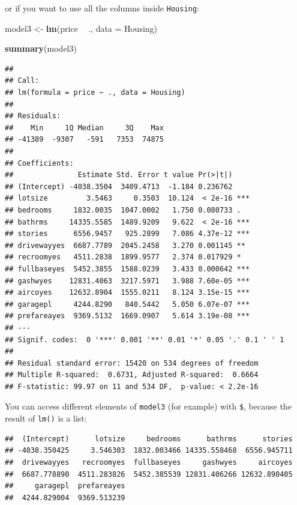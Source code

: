 \documentclass[]{gitbook}
\newenvironment{Shaded}{\begin{snugshade}}{\end{snugshade}}
\newcommand{\DataTypeTok}[1]{\textcolor[rgb]{0.13,0.29,0.53}{#1}}
\newcommand{\KeywordTok}[1]{\textcolor[rgb]{0.13,0.29,0.53}{\textbf{#1}}}
\newcommand{\NormalTok}[1]{#1}
\newcommand{\OperatorTok}[1]{\textcolor[rgb]{0.81,0.36,0.00}{\textbf{#1}}}
\newcommand{\StringTok}[1]{\textcolor[rgb]{0.31,0.60,0.02}{#1}}
\begin{document}
or if you want to use all the columns inside \texttt{Housing}:

\begin{Shaded}
\begin{Highlighting}[]
\NormalTok{model3 <-}\StringTok{ }\KeywordTok{lm}\NormalTok{(price }\OperatorTok{~}\StringTok{ }\NormalTok{., }\DataTypeTok{data =}\NormalTok{ Housing)}

\KeywordTok{summary}\NormalTok{(model3)}
\end{Highlighting}
\end{Shaded}

\begin{verbatim}
## 
## Call:
## lm(formula = price ~ ., data = Housing)
## 
## Residuals:
##    Min     1Q Median     3Q    Max 
## -41389  -9307   -591   7353  74875 
## 
## Coefficients:
##               Estimate Std. Error t value Pr(>|t|)    
## (Intercept) -4038.3504  3409.4713  -1.184 0.236762    
## lotsize         3.5463     0.3503  10.124  < 2e-16 ***
## bedrooms     1832.0035  1047.0002   1.750 0.080733 .  
## bathrms     14335.5585  1489.9209   9.622  < 2e-16 ***
## stories      6556.9457   925.2899   7.086 4.37e-12 ***
## drivewayyes  6687.7789  2045.2458   3.270 0.001145 ** 
## recroomyes   4511.2838  1899.9577   2.374 0.017929 *  
## fullbaseyes  5452.3855  1588.0239   3.433 0.000642 ***
## gashwyes    12831.4063  3217.5971   3.988 7.60e-05 ***
## aircoyes    12632.8904  1555.0211   8.124 3.15e-15 ***
## garagepl     4244.8290   840.5442   5.050 6.07e-07 ***
## prefareayes  9369.5132  1669.0907   5.614 3.19e-08 ***
## ---
## Signif. codes:  0 '***' 0.001 '**' 0.01 '*' 0.05 '.' 0.1 ' ' 1
## 
## Residual standard error: 15420 on 534 degrees of freedom
## Multiple R-squared:  0.6731, Adjusted R-squared:  0.6664 
## F-statistic: 99.97 on 11 and 534 DF,  p-value: < 2.2e-16
\end{verbatim}

You can access different elements of \texttt{model3} (for example) with \texttt{\$}, because the result of \texttt{lm()}
is a list:

\begin{Shaded}
\end{Shaded}

\begin{verbatim}
##  (Intercept)      lotsize     bedrooms      bathrms      stories 
## -4038.350425     3.546303  1832.003466 14335.558468  6556.945711 
##  drivewayyes   recroomyes  fullbaseyes     gashwyes     aircoyes 
##  6687.778890  4511.283826  5452.385539 12831.406266 12632.890405 
##     garagepl  prefareayes 
##  4244.829004  9369.513239
\end{verbatim}
\end{document}

